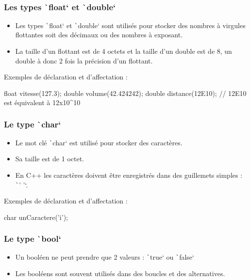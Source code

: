 \documentclass[10pt]{article}
\begin{document}
\subsubsection{Les types \texttt`float` et \texttt`double`}
\begin{itemize}
    \item Les types \texttt`float` et \texttt`double` sont utilisés pour stocker des nombres à virgules flottantes soit des décimaux ou des nombres à exposant.
    \item La taille d'un flottant est de 4 octets et la taille d'un double est de 8, un double à donc 2 fois la précision d'un flottant.
\end{itemize}

Exemples de déclaration et d'affectation :

\begin{cppcode}
    float vitesse(127.3);
    double volume(42.424242);
    double distance(12E10); // 12E10 est équivalent à 12x10^10
\end{cppcode}


\subsubsection{Le type \texttt`char`}
\begin{itemize}
    \item Le mot clé \texttt`char` est utilisé pour stocker des caractères.
    \item Sa taille est de 1 octet.
    \item En C++ les caractères doivent être enregistrés dans des guillemets simples : \texttt`' '`.
\end{itemize}

Exemples de déclaration et d'affectation :

\begin{cppcode}
    char unCaractere('i');
\end{cppcode}

\subsubsection{Le type \texttt`bool`}
\begin{itemize}
    \item Un booléen ne peut prendre que 2 valeurs : \texttt`true` ou \texttt`false`
    \item Les booléens sont souvent utilisés dans des boucles et des alternatives.
\end{itemize} 
\end{document}
